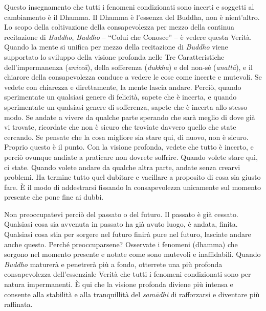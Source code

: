 Questo insegnamento che tutti i fenomeni condizionati sono incerti e
soggetti al cambiamento è il Dhamma. Il Dhamma è l'essenza del Buddha,
non è nient'altro. Lo scopo della coltivazione della consapevolezza per
mezzo della continua recitazione di \emph{Buddho}, \emph{Buddho} --
``Colui che Conosce'' -- è vedere questa Verità. Quando la mente si
unifica per mezzo della recitazione di \emph{Buddho} viene supportato lo
sviluppo della visione profonda nelle Tre Caratteristiche
dell'impermanenza (\emph{aniccā}), della sofferenza (\emph{dukkha}) e
del non-sé (\emph{anattā}), e il chiarore della consapevolezza conduce a
vedere le cose come incerte e mutevoli. Se vedete con chiarezza e
direttamente, la mente lascia andare. Perciò, quando sperimentate un
qualsiasi genere di felicità, sapete che è incerta, e quando
sperimentate un qualsiasi genere di sofferenza, sapete che è incerta
allo stesso modo. Se andate a vivere da qualche parte sperando che sarà
meglio di dove già vi trovate, ricordate che non è sicuro che troviate
davvero quello che state cercando. Se pensate che la cosa migliore sia
stare qui, di nuovo, non è sicuro. Proprio questo è il punto. Con la
visione profonda, vedete che tutto è incerto, e perciò ovunque andiate a
praticare non dovrete soffrire. Quando volete stare qui, ci state.
Quando volete andare da qualche altra parte, andate senza crearvi
problemi. Ha termine tutto quel dubitare e vacillare a proposito di cosa
sia giusto fare. È il modo di addestrarsi fissando la consapevolezza
unicamente sul momento presente che pone fine ai dubbi.

Non preoccupatevi perciò del passato o del futuro. Il passato è già
cessato. Qualsiasi cosa sia avvenuta in passato ha già avuto luogo, è
andata, finita. Qualsiasi cosa stia per sorgere nel futuro finirà pure
nel futuro, lasciate andare anche questo. Perché preoccuparsene?
Osservate i fenomeni (dhamma) che sorgono nel momento presente e
notate come sono mutevoli e inaffidabili. Quando \emph{Buddho} maturerà
e penetrerà più a fondo, otterrete una più profonda consapevolezza
dell'essenziale Verità che tutti i fenomeni condizionati sono per natura
impermanenti. È qui che la visione profonda diviene più intensa e
consente alla stabilità e alla tranquillità del \emph{samādhi} di
rafforzarsi e diventare più raffinata.


